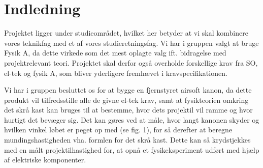 \section{Indledning}

Projektet ligger under studieområdet, hvilket her betyder at vi skal kombinere vores teknikfag med et af vores studieretningsfag. Vi har i gruppen valgt at bruge Fysik A, da dette virkede som det mest oplagte valg ift. bidragelse med projektrelevant teori. Projektet skal derfor også overholde forskellige krav fra SO, el-tek og fysik A, som bliver yderligere fremhævet i kravspecifikationen. 

Vi har i gruppen besluttet os for at bygge en fjernstyret airsoft kanon, da dette produkt vil tilfredsstille alle de givne el-tek krav, samt at fysikteorien omkring det skrå kast kan bruges til at bestemme, hvor dets projektil vil ramme og hvor hurtigt det bevæger sig. Det kan gøres ved at måle, hvor langt kanonen skyder og hvilken vinkel løbet er peget op med (se fig. 1), for så derefter at beregne mundingshastigheden vha. formlen for det skrå kast. Dette kan så krydstjekkes med en målt projektilhastighed for, at opnå et fysikeksperiment udført med hjælp af elektriske komponenter.
